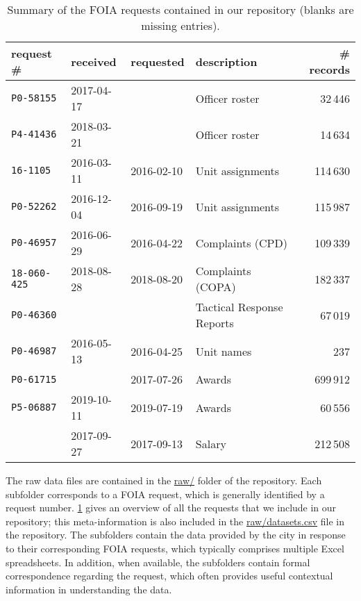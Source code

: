 \begin{table}[h]
	\begin{center}
\begin{tabular}{@{}llllr@{}}
	\toprule
	request \#&received&requested&description& \# records\\
\midrule
	\texttt{P0-58155}&2017-04-17& &Officer roster& 32\,446\\
	\texttt{P4-41436}&2018-03-21& &Officer roster& 14\,634\\
	\texttt{16-1105}&2016-03-11&2016-02-10&Unit assignments&114\,630\\
	\texttt{P0-52262}&2016-12-04&2016-09-19&Unit assignments&115\,987\\
	\texttt{P0-46957}&2016-06-29&2016-04-22&Complaints (CPD)&109\,339\\
	\texttt{18-060-425}&2018-08-28&2018-08-20&Complaints (COPA)&182\,337\\
	\texttt{P0-46360}& & &Tactical Response Reports&67\,019\\
	\texttt{P0-46987}&2016-05-13&2016-04-25&Unit names&237\\
	\texttt{P0-61715}& &2017-07-26&Awards&699\,912\\
	\texttt{P5-06887}&2019-10-11&2019-07-19&Awards&60\,556\\
					 &2017-09-27&2017-09-13&Salary&212\,508\\
\bottomrule
\end{tabular}
\vspace{0.7em}
\caption{Summary of the FOIA requests contained in our repository (blanks are missing entries).}
\label{table:summary}
\end{center}
\end{table}

The raw data files are contained in the \url{raw/} folder of the
repository. Each subfolder corresponds to a FOIA request, which is
generally identified by a request number. \cref{table:summary} gives
an overview of all the requests that we include in
our repository; this meta-information is also included in the \url{raw/datasets.csv}
file in the repository. The subfolders contain the data provided by the city
in response to their corresponding FOIA requests, which typically comprises multiple
Excel spreadsheets. In addition, when available, the subfolders contain formal correspondence 
regarding the request, which often provides useful contextual information in understanding the data.  

